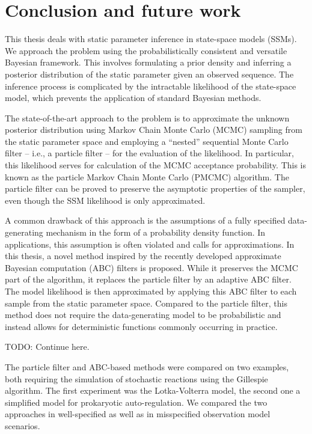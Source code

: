 \chapter{Conclusion and future work}
\label{chap:conclusion}

This thesis deals with static parameter inference in state-space models (SSMs). We approach the problem using the probabilistically consistent and versatile Bayesian framework. This involves formulating a prior density and inferring a posterior distribution of the static parameter given an observed sequence. The inference process is complicated by the intractable likelihood of the state-space model, which prevents the application of standard Bayesian methods.

The state-of-the-art approach to the problem is to approximate the unknown posterior distribution using Markov Chain Monte Carlo (MCMC) sampling from the static parameter space and employing a ``nested'' sequential Monte Carlo filter -- i.e., a particle filter -- for the evaluation of the likelihood. In particular, this likelihood serves for calculation of the MCMC acceptance probability. This is known as the particle Markov Chain Monte Carlo (PMCMC) algorithm. The particle filter can be proved to preserve the asymptotic properties of the sampler, even though the SSM likelihood is only approximated.

A common drawback of this approach is the assumptions of a fully specified data-generating mechanism in the form of a probability density function. In applications, this assumption is often violated and calls for approximations. In this thesis, a novel method inspired by the recently developed approximate Bayesian computation (ABC) filters is proposed. While it preserves the MCMC part of the algorithm, it replaces the particle filter by an adaptive ABC filter. The model likelihood is then approximated by applying this ABC filter to each sample from the static parameter space. Compared to the particle filter, this method does not require the data-generating model to be probabilistic and instead allows for deterministic functions commonly occurring in practice.

{\color{red} TODO: Continue here.}

The particle filter and ABC-based methods were compared on two examples, both requiring the simulation of stochastic reactions using the Gillespie algorithm. The first experiment was the Lotka-Volterra model, the second one a simplified model for prokaryotic auto-regulation. We compared the two approaches in well-specified as well as in misspecified observation model scenarios.

